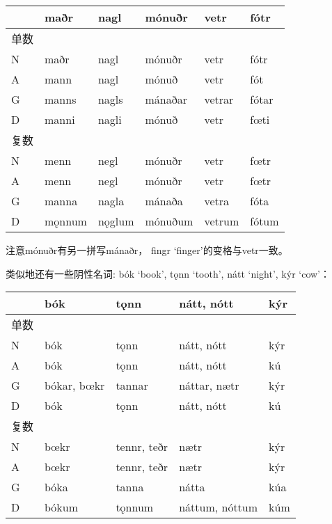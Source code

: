 \begin{longtable}{llllll}
  \toprule
     & \textbf{maðr} & \textbf{nagl} & \textbf{mónuðr} & \textbf{vetr} & \textbf{fótr} \\
  \midrule
  \endhead
  \bottomrule
  \endfoot
  单数 &               &               &                 &               &               \\
  N  & maðr          & nagl          & mónuðr          & vetr          & fótr          \\
  A  & mann          & nagl          & mónuð           & vetr          & fót           \\
  G  & manns         & nagls         & mánaðar         & vetrar        & fótar         \\
  D  & manni         & nagli         & mónuð           & vetr          & fœti          \\
  复数 &               &               &                 &               &               \\
  N  & menn          & negl          & mónuðr          & vetr          & fœtr          \\
  A  & menn          & negl          & mónuðr          & vetr          & fœtr          \\
  G  & manna         & nagla         & mánaða          & vetra         & fóta          \\
  D  & mǫnnum        & nǫglum        & mónuðum         & vetrum        & fótum         \\
\end{longtable}

注意mónuðr有另一拼写mánaðr， fingr `finger‌'的变格与vetr一致。

类似地还有一些阴性名词: bók `book', tǫnn `tooth', nátt `night', kýr
`cow'：

\begin{longtable}{lllll}
  \toprule
     & \textbf{bók} & \textbf{tǫnn} & \textbf{nátt, nótt} & \textbf{kýr} \\
  \midrule
  \endhead
  \bottomrule
  \endfoot
  单数 &              &               &                     &              \\
  N  & bók          & tǫnn          & nátt, nótt          & kýr          \\
  A  & bók          & tǫnn          & nátt, nótt          & kú           \\
  G  & bókar, bœkr  & tannar        & náttar, nætr        & kýr          \\
  D  & bók          & tǫnn          & nátt, nótt          & kú           \\
  复数 &              &               &                     &              \\
  N  & bœkr         & tennr, teðr   & nætr                & kýr          \\
  A  & bœkr         & tennr, teðr   & nætr                & kýr          \\
  G  & bóka         & tanna         & nátta               & kúa          \\
  D  & bókum        & tǫnnum        & náttum, nóttum      & kúm          \\
\end{longtable}

